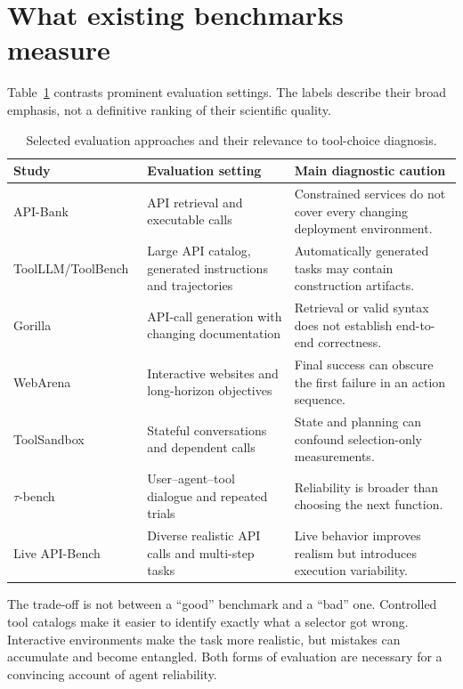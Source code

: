 \documentclass[10pt,a4paper]{article}
\begin{document}
\section{What existing benchmarks measure}
Table~\ref{tab:bench} contrasts prominent evaluation settings. The labels describe their broad emphasis, not a definitive ranking of their scientific quality.
\begin{table}[ht]
\centering\scriptsize
\caption{Selected evaluation approaches and their relevance to tool-choice diagnosis.}\label{tab:bench}
\begin{tabularx}{\linewidth}{@{}p{.21\linewidth}p{.32\linewidth}X@{}}
\toprule
Study & Evaluation setting & Main diagnostic caution\\\midrule
API-Bank~\cite{apibank} & API retrieval and executable calls & Constrained services do not cover every changing deployment environment.\\
ToolLLM/ToolBench~\cite{toolllm} & Large API catalog, generated instructions and trajectories & Automatically generated tasks may contain construction artifacts.\\
Gorilla~\cite{gorilla} & API-call generation with changing documentation & Retrieval or valid syntax does not establish end-to-end correctness.\\
WebArena~\cite{webarena} & Interactive websites and long-horizon objectives & Final success can obscure the first failure in an action sequence.\\
ToolSandbox~\cite{toolsandbox} & Stateful conversations and dependent calls & State and planning can confound selection-only measurements.\\
$\tau$-bench~\cite{taubench} & User--agent--tool dialogue and repeated trials & Reliability is broader than choosing the next function.\\
Live API-Bench~\cite{liveapibench} & Diverse realistic API calls and multi-step tasks & Live behavior improves realism but introduces execution variability.\\\bottomrule
\end{tabularx}
\end{table}

The trade-off is not between a ``good'' benchmark and a ``bad'' one. Controlled tool catalogs make it easier to identify exactly what a selector got wrong. Interactive environments make the task more realistic, but mistakes can accumulate and become entangled. Both forms of evaluation are necessary for a convincing account of agent reliability.
\end{document}
